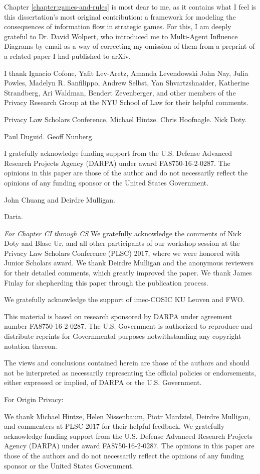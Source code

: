 \documentclass[../thesis.tex]{subfiles}
\begin{document}
 Chapter \ref{chapter:games-and-rules} is most dear to me, as it contains what I feel is this dissertation's most original contribution: a framework for modeling the consequences of information flow in strategic games.
 For this, I am deeply grateful to Dr. David Wolpert, who introduced me to Multi-Agent Influence Diagrams by email as a way of correcting my omission of them from a preprint of a related paper I had published to arXiv.
 


 
I thank Ignacio Cofone, Yafit Lev-Aretz, Amanda Levendowski
 John Nay, Julia Powles,
Madelyn R. Sanfilippo, Andrew Selbst, Yan Shvartzshnaider, Katherine
Strandberg, Ari Waldman, Bendert Zevenberger,  
and other members of the Privacy Research Group at
the NYU School of Law for their helpful comments.

Privacy Law Scholars Conference. Michael Hintze. Chris Hoofnagle.
Nick Doty.

Paul Duguid. Geoff Nunberg.

I gratefully acknowledge funding support 
from the U.S. Defense Advanced Research Projects Agency (DARPA) under
award FA8750-16-2-0287.
The opinions in this paper are those of the author and do not
necessarily reflect the opinions of any funding sponsor or the United
States Government.

John Chuang and Deirdre Mulligan.

Daria.


\emph{For Chapter CI through CS} We gratefully acknowledge the comments of Nick Doty and Blase Ur, and
all other participants of our workshop session at the Privacy Law
Scholars Conference (PLSC) 2017, where we were honored with Junior
Scholars award. We thank Deirdre Mulligan and the anonymous reviewers
for their detailed comments, which greatly improved the paper. We thank
James Finlay for shepherding this paper through the publication
process.

We gratefully acknowledge the support of imec-COSIC KU Leuven and FWO.


This material is based on research sponsored by DARPA under agreement
number FA8750-16-2-0287. The U.S. Government is authorized to reproduce
and distribute reprints for Governmental purposes notwithstanding any
copyright notation thereon.

The views and conclusions contained herein are those of the authors and
should not be interpreted as necessarily representing the official
policies or endorsements, either expressed or implied, of DARPA or the
U.S. Government.



For Origin Privacy:

We thank Michael Hintze, Helen Nissenbaum, Piotr Mardziel,
Deirdre Mulligan, 
and commenters at PLSC 2017 for
their helpful feedback.
We gratefully acknowledge funding support 
from the U.S. Defense Advanced Research Projects
Agency (DARPA) under
award FA8750-16-2-0287.
The opinions in this paper are those of the authors and do not
necessarily reflect the opinions of any funding sponsor or the United States Government.

 
\end{document}
